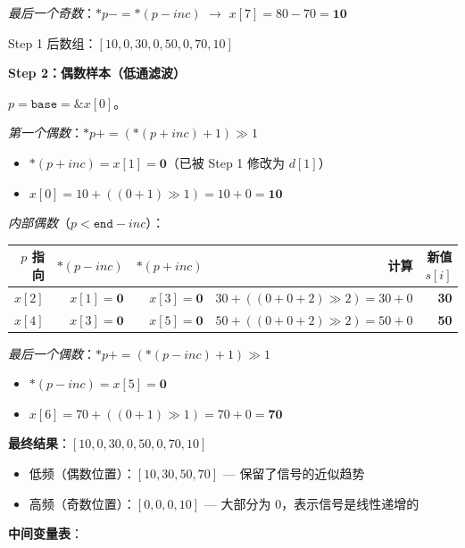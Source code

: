 \begin{examplebox}[title={DWT Worked Example 1：1D 5/3 Lifting 正变换}]
\textit{最后一个奇数}：$*p -= *(p - \mathit{inc})$ $\to$ $x[7] = 80 - 70 = \mathbf{10}$

Step 1 后数组：$[10, 0, 30, 0, 50, 0, 70, 10]$

\textbf{Step 2：偶数样本（低通滤波）}

$p = \texttt{base} = \&x[0]$。

\textit{第一个偶数}：$*p += (*(p + \mathit{inc}) + 1) \gg 1$
\begin{itemize}
  \item $*(p + \mathit{inc}) = x[1] = \mathbf{0}$（已被 Step 1 修改为 $d[1]$）
  \item $x[0] = 10 + ((0 + 1) \gg 1) = 10 + 0 = \mathbf{10}$
\end{itemize}

\textit{内部偶数}（$p < \texttt{end} - \mathit{inc}$）：

\begin{tabular}{@{}rrrrr@{}}
\toprule
$p$ 指向 & $*(p-\mathit{inc})$ & $*(p+\mathit{inc})$ & 计算 & 新值 $s[i]$ \\
\midrule
$x[2]$ & $x[1]=\mathbf{0}$ & $x[3]=\mathbf{0}$ & $30 + ((0+0+2)\gg2) = 30 + 0$ & \textbf{30} \\
$x[4]$ & $x[3]=\mathbf{0}$ & $x[5]=\mathbf{0}$ & $50 + ((0+0+2)\gg2) = 50 + 0$ & \textbf{50} \\
\bottomrule
\end{tabular}

\textit{最后一个偶数}：$*p += (*(p - \mathit{inc}) + 1) \gg 1$
\begin{itemize}
  \item $*(p - \mathit{inc}) = x[5] = \mathbf{0}$
  \item $x[6] = 70 + ((0 + 1) \gg 1) = 70 + 0 = \mathbf{70}$
\end{itemize}

\textbf{最终结果}：$[10, 0, 30, 0, 50, 0, 70, 10]$
\begin{itemize}
  \item 低频（偶数位置）：$[10, 30, 50, 70]$ — 保留了信号的近似趋势
  \item 高频（奇数位置）：$[0, 0, 0, 10]$ — 大部分为 0，表示信号是线性递增的
\end{itemize}

\textbf{中间变量表}：


\end{examplebox}
